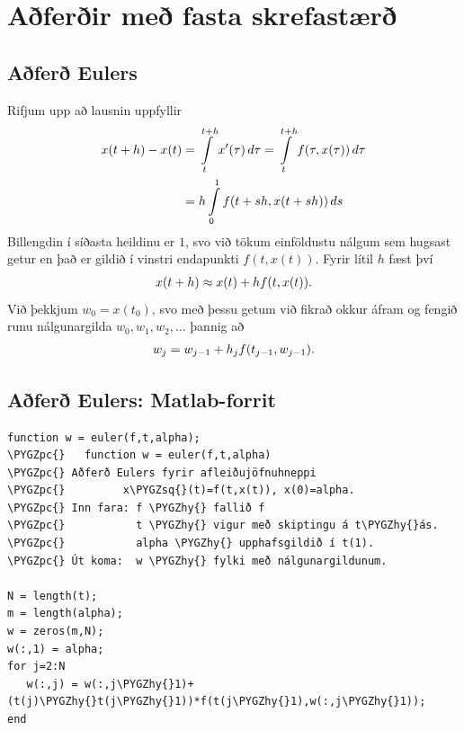 \documentclass[letterpaper,10pt,icelandic]{sphinxmanual}
\def\PYGZpc{\char`\%}
\def\PYGZhy{\char`\-}
\def\PYGZsq{\char`\'}
\renewcommand\PYGZsq{\textquotesingle}
\begin{document}
\section{Aðferðir með fasta skrefastærð}
\label{kafli06:aferir-me-fasta-skrefastaer}

\subsection{Aðferð Eulers}
\label{kafli06:index-7}\label{kafli06:afer-eulers}
Rifjum upp að lausnin uppfyllir
\begin{gather}
\begin{split}\begin{aligned}
  x(t+h) - x(t) &= \int\limits_t^{t+h} x'(\tau) \, d\tau
  = \int\limits_t^{t+h} f(\tau,x(\tau)) \, d\tau\\
&= h\int\limits_0^{1} f(t+sh,x(t+sh)) \, ds\end{aligned}\end{split}\notag
\end{gather}
Billengdin í síðasta heildinu er \(1\), svo við tökum einföldustu
nálgum sem hugsast getur en það er gildið í vinstri endapunkti
\(f(t,x(t))\). Fyrir lítil \(h\) fæst því
\begin{gather}
\begin{split}x(t+h) \approx x(t) + hf(t,x(t)).\end{split}\notag
\end{gather}
Við þekkjum \(w_0=x(t_0)\), svo með þessu getum við fikrað okkur
áfram og fengið runu nálgunargilda \(w_0, w_1, w_2, \ldots\) þannig
að
\begin{gather}
\begin{split}w_j = w_{j-1} + h_{j} f(t_{j-1},w_{j-1}).\end{split}\notag
\end{gather}

\subsection{Aðferð Eulers: Matlab-forrit}
\label{kafli06:afer-eulers-matlab-forrit}
\begin{Verbatim}[commandchars=\\\{\}]
function w = euler(f,t,alpha);
\PYGZpc{}   function w = euler(f,t,alpha)
\PYGZpc{} Aðferð Eulers fyrir afleiðujöfnuhneppi
\PYGZpc{}         x\PYGZsq{}(t)=f(t,x(t)), x(0)=alpha.
\PYGZpc{} Inn fara: f \PYGZhy{} fallið f
\PYGZpc{}           t \PYGZhy{} vigur með skiptingu á t\PYGZhy{}ás.
\PYGZpc{}           alpha \PYGZhy{} upphafsgildið í t(1).
\PYGZpc{} Út koma:  w \PYGZhy{} fylki með nálgunargildunum.

N = length(t);
m = length(alpha);
w = zeros(m,N);
w(:,1) = alpha;
for j=2:N
   w(:,j) = w(:,j\PYGZhy{}1)+(t(j)\PYGZhy{}t(j\PYGZhy{}1))*f(t(j\PYGZhy{}1),w(:,j\PYGZhy{}1));
end
\end{Verbatim}
\end{document}
